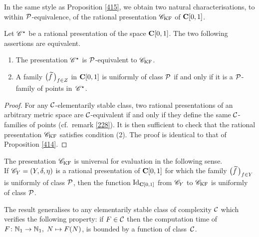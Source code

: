 In the same style as Proposition \ref{415}, we obtain two natural characterisations, to within ${\cal P}$-equivalence, of the rational presentation ${{{\mathscr C}}_{\rm KF}}$ of ${{\bf C}[0,1]}$.
 
\begin{proposition} \label{416}
Let ${{\mathscr C}}^{\star}$ be a rational presentation of the space ${{\bf C}[0,1]}$. 
The two following assertions are equivalent. 
%
\begin{enumerate}
%
\item The presentation ${{\mathscr C}}^{\star}$ is ${\cal P}$-equivalent to ${{{\mathscr C}}_{\rm KF}}$.
%
\item A family $\big(\widetilde{f}\,\big)_{f \in Z}$ in ${{\bf C}[0,1]}$ is uniformly of class ${\cal P}$ if and only if it is a ${\cal P}$-family of points in~${{\mathscr C}}^{\star}$.
%
\end{enumerate}
\end{proposition}

\begin{proof} 
For any ${{\cal C}}$-elementarily stable class, two rational presentations of an arbitrary 
metric space are ${{\cal C}}$-equivalent if and only if they 
define the same ${{\cal C}}$-families of points (cf.\ remark \ref{228}). It is then sufficient to
check that the rational presentation ${{{\mathscr C}}_{\rm KF}}$ satisfies condition (2). The 
proof is identical to that of Proposition \ref{414}. 
 \end{proof}



\begin{theorem} \label{417}
The presentation ${{{\mathscr C}}_{\rm KF}}$ is universal for evaluation in the following sense. \\
If ${{\mathscr C}}_Y=(Y,\delta,\eta)$ is a rational presentation of ${{\bf C}[0,1]}$ for which the family $\big(\widetilde{f}\,\big)_{f \in Y}$ is uniformly of class ${\cal P}$,  then the function ${\rm Id}_{{\bf C}[0,1]}$ from ${{\mathscr C}}_Y$ to ${{{\mathscr C}}_{\rm KF}}$ is uniformly of class ${\cal P}$. 
 

\noindent The result generalises to any elementarily stable class of complexity ${{\cal C}}$ which verifies the following property:
if $F \in {{\cal C}}$ then the computation time of $F\colon \mathbb {N}_1 \to \mathbb {N}_1,\; N 
\mapsto F(N)$, is bounded by a function of class~${{\cal C}}$.
\end{theorem}

